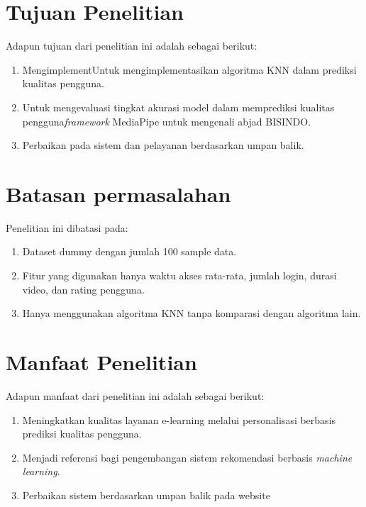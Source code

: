 \section{Tujuan Penelitian}  
Adapun tujuan dari penelitian ini adalah sebagai berikut: 
\begin{enumerate}
    \item MengimplementUntuk mengimplementasikan algoritma KNN dalam prediksi kualitas pengguna.
    \item  Untuk mengevaluasi tingkat akurasi model dalam memprediksi kualitas pengguna\textit{framework} MediaPipe untuk mengenali abjad BISINDO.
    \item Perbaikan pada sistem dan pelayanan berdasarkan umpan balik.
\end{enumerate}

\section{Batasan permasalahan}

\par Penelitian ini dibatasi pada:
\begin{enumerate}
    \item Dataset dummy dengan jumlah 100 sample data.
    \item Fitur yang digunakan hanya waktu akses rata-rata, jumlah login, durasi video, dan rating pengguna.
    \item Hanya menggunakan algoritma KNN tanpa komparasi dengan algoritma lain.
\end{enumerate}

\section{Manfaat Penelitian}  
\par Adapun manfaat dari penelitian ini adalah sebagai berikut:  
\begin{enumerate}
    \item Meningkatkan kualitas layanan e-learning melalui personalisasi berbasis prediksi kualitas pengguna.
    \item Menjadi referensi bagi pengembangan sistem rekomendasi berbasis \textit{machine learning}.
    \item Perbaikan sistem berdasarkan umpan balik pada website
\end{enumerate}

